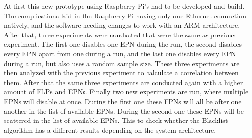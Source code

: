 At first this new prototype using Raspberry Pi's had to be developed and build. The complications laid in the Raspberry Pi having only one Ethernet connection natively, and the software needing changes to work with an ARM architecture. After that, three experiments were conducted that were the same as previous experiment. The first one disables one EPN during the run, the second disables every EPN apart from one during a run, and the last one disables every EPN during a run, but also uses a random sample size. These three experiments are then analyzed with the previous experiment to calculate a correlation between them. After that the same three experiments are conducted again with a higher amount of FLPs and EPNs. Finally two new experiments are run, where multiple EPNs will disable at once. During the first one these EPNs will all be after one another in the list of available EPNs. During the second one these EPNs will be scattered in the list of available EPNs. This to check whether the Blacklist algorithm has a different results depending on the system architecture.